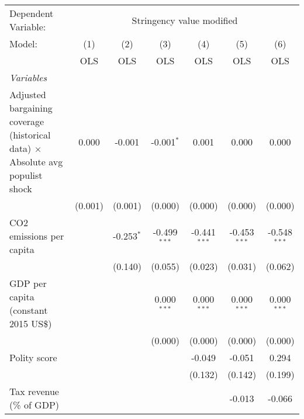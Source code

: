
\begingroup
\centering
\begin{tabular}{lcccccc}
   \toprule
   Dependent Variable: & \multicolumn{6}{c}{Stringency value modified}\\
   Model:                                                                               & (1)     & (2)          & (3)            & (4)            & (5)            & (6)\\  
                                                                                        &  OLS    & OLS          & OLS            & OLS            & OLS            & OLS\\  
   \midrule
   \emph{Variables}\\
   Adjusted bargaining coverage (historical data) $\times$ Absolute avg populist shock  & 0.000   & -0.001       & -0.001$^{*}$   & 0.001          & 0.000          & 0.000\\   
                                                                                        & (0.001) & (0.001)      & (0.000)        & (0.000)        & (0.000)        & (0.000)\\   
   CO2 emissions per capita                                                             &         & -0.253$^{*}$ & -0.499$^{***}$ & -0.441$^{***}$ & -0.453$^{***}$ & -0.548$^{***}$\\   
                                                                                        &         & (0.140)      & (0.055)        & (0.023)        & (0.031)        & (0.062)\\   
   GDP per capita (constant 2015 US\$)                                                  &         &              & 0.000$^{***}$  & 0.000$^{***}$  & 0.000$^{***}$  & 0.000$^{***}$\\   
                                                                                        &         &              & (0.000)        & (0.000)        & (0.000)        & (0.000)\\   
   Polity score                                                                         &         &              &                & -0.049         & -0.051         & 0.294\\   
                                                                                        &         &              &                & (0.132)        & (0.142)        & (0.199)\\   
   Tax revenue (\% of GDP)                                                              &         &              &                &                & -0.013         & -0.066\\   

\end{tabular}
